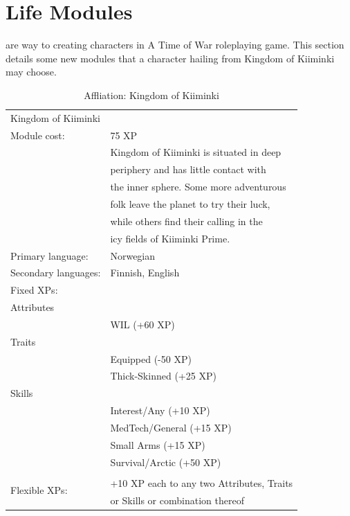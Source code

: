 \documentclass{tufte-book}
\begin{document}
\chapter{Life Modules}
\label{sc:life-modules}

 are way to creating characters in A Time of War
roleplaying game. This section details some new modules that a character
hailing from Kingdom of Kiiminki may choose.

\bigskip
\begin{table}
\begin{minipage}{\textwidth}
\begin{center}
\begin{tabular}{ll}
\toprule
\multicolumn{2}{l}{Kingdom of Kiiminki} \\
Module cost: & 75 XP \\
\multirow{6}{*}[0.75em]{} & Kingdom of Kiiminki is situated in deep  \\
                          & periphery and has little contact with    \\
                          & the inner sphere. Some more adventurous  \\
                          & folk leave the planet to try their luck, \\
                          & while others find their calling in the   \\
                          & icy fields of Kiiminki Prime.            \\
Primary language: & Norwegian \\
Secondary languages: & Finnish, English \\
Fixed XPs: & \\
\quad Attributes & \\
& WIL (+60 XP) \\
\quad Traits & \\
& Equipped (-50 XP) \\
& Thick-Skinned (+25 XP) \\
\quad Skills & \\
& Interest/Any (+10 XP) \\
& MedTech/General (+15 XP) \\
& Small Arms (+15 XP) \\
& Survival/Arctic (+50 XP) \\

\multirow{3}{*}[0.75em]{Flexible XPs:} \\
                                       & +10 XP each to any two Attributes, Traits \\
                                       & or Skills or combination thereof \\

\bottomrule
\end{tabular}
\end{center}
\end{minipage}
\caption{Affliation: Kingdom of Kiiminki}
\end{table}
\end{document}
